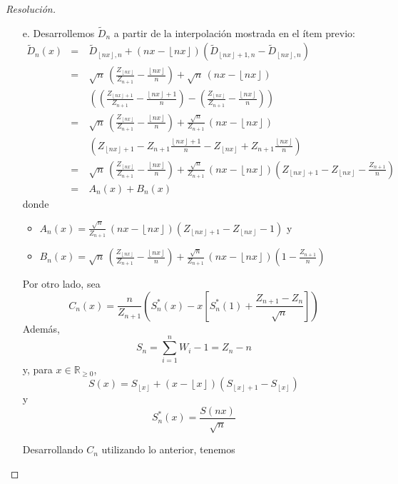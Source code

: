 \documentclass[a4paper,11pt]{article}
\newcommand{\Sst}[1]{S_n^{*}(#1)}
\newcommand{\floor}[1]{\left\lfloor #1 \right\rfloor}
\newcommand{\Dn}[1]{\tilde{D}_{#1 ,n}}
\newcommand{\fnx}{\floor{nx}}
\newcommand{\fnxp}{\floor{nx}+1}
\begin{document}
\begin{proof}[Resoluci\'on]
\begin{enumerate}
    \item[e.] Desarrollemos $\tilde{D}_n$ a partir de la interpolación mostrada en el ítem previo:
    \begin{eqnarray*}
        \tilde{D}_n(x)
            &=& \Dn{\floor{nx}} + (nx - \floor{nx}) \left(\Dn{\floor{nx} + 1} - \Dn{\floor{nx}}\right) \\
            &=& \sqrt{n} \, \left(\frac{Z_{\fnx}}{Z_{n+1}} − \frac{\fnx}{n} \right) + \sqrt{n} \, (nx - \floor{nx}) \\
            &\quad&  \left(\left(\frac{Z_{\fnxp}}{Z_{n+1}} − \frac{\fnxp}{n}\right) - \left(\frac{Z_{\fnx}}{Z_{n+1}} − \frac{\fnx}{n}\right)\right) \\
            &=& \sqrt{n} \, \left(\frac{Z_{\fnx}}{Z_{n+1}} − \frac{\fnx}{n} \right) + \frac{\sqrt{n}}{Z_{n+1}} \, (nx - \floor{nx}) \\
            &\quad&  \left(Z_{\fnxp} − Z_{n+1} \frac{\fnxp}{n} - Z_{\fnx} + Z_{n+1} \frac{\fnx}{n} \right) \\
            &=& \sqrt{n} \, \left(\frac{Z_{\fnx}}{Z_{n+1}} − \frac{\fnx}{n} \right) + \frac{\sqrt{n}}{Z_{n+1}} \, (nx - \floor{nx}) 
                \left(Z_{\fnxp} - Z_{\fnx} - \frac{Z_{n+1}}{n} \right) \\
            &=& A_n(x) + B_n(x)
    \end{eqnarray*}
    donde
    \begin{itemize}
        \item $A_n(x) = \frac{\sqrt{n}}{Z_{n+1}} \, (nx - \floor{nx})  \left(Z_{\fnxp} - Z_{\fnx} - 1 \right)$ y
        \item $B_n(x) =  \sqrt{n} \, \left(\frac{Z_{\fnx}}{Z_{n+1}} − \frac{\fnx}{n} \right) + \frac{\sqrt{n}}{Z_{n+1}} \, (nx - \floor{nx}) \left(1 - \frac{Z_{n+1}}{n}\right)$
    \end{itemize}

    Por otro lado, sea
    $$C_n(x) = \frac{n}{Z_{n+1}} \left(\Sst{x} - x \left[ \Sst{1} + \frac{Z_{n+1} - Z_n}{\sqrt{n}} \right] \right)$$
    Además,
    $$S_n = \sum_{i = 1}^{n}{W_i - 1} = Z_n - n$$
    y, para $x \in \mathbb{R}_{\geq 0}$,
    $$S(x) = S_{\floor{x}} + (x - \floor{x}) (S_{\floor{x}+1} - S_{\floor{x}})$$
    y
    $$\Sst{x} = \frac{S(nx)}{\sqrt{n}}$$

    Desarrollando $C_n$ utilizando lo anterior, tenemos


\end{enumerate}
\end{proof}
\end{document}
